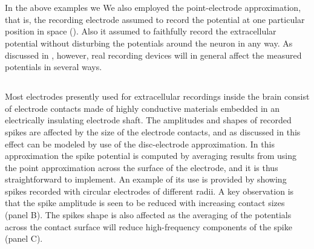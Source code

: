 \section{}
In the above examples we 
We  also employed the point-electrode approximation, that is, 
the recording electrode  assumed to record the potential at one particular position in space (). 
Also it  assumed to faithfully record the extracellular potential 
without disturbing the potentials around the neuron in any way.  
As discussed in , however, 
real recording devices will in general affect the measured potentials in several ways.  

\subsection{}
\label{sec:Spikes:electrode_size}
Most electrodes presently used for extracellular recordings inside the brain consist of electrode contacts made of
highly conductive materials embedded in an electrically insulating electrode shaft. 
The amplitudes and shapes of recorded spikes are affected by the size of the electrode contacts, 
and as discussed in  
this effect can be modeled by use of the disc-electrode approximation. 
In this approximation the spike potential is computed
by averaging results from using the point approximation across the surface of the electrode, 
and it is thus straightforward to implement. 
An example of its use is provided by  
showing spikes recorded with circular electrodes of different radii. 
A key observation is that the spike amplitude is seen to be reduced with increasing contact sizes (panel B). 
The spikes shape is also affected as the averaging of the potentials across the contact surface 
will reduce high-frequency components of the spike (panel C).

